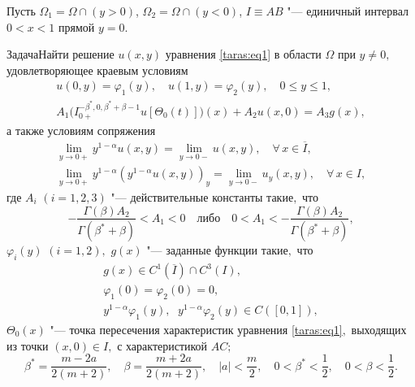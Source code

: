 Пусть $\Omega_{1}= \Omega \cap (y>0)$, $\Omega_{2}= \Omega \cap (y<0)$, $I \equiv AB$ "--- единичный интервал $0<x<1$ прямой $y=0$.

\smallskip

\begin{newthm}{Задача}Найти решение $u(x,y)$ уравнения \eqref{taras:eq1} в области $\Omega$ при $y \ne 0,$ удовлетворяющее краевым условиям
\begin{gather}
\label{taras:eq3}
u(0, y) = \varphi_{1}(y), \quad  u(1, y) = \varphi_{2}(y), \quad  0 \leqslant y \leqslant 1,
\\
\label{taras:eq4}
A_{1} \bigl( I^{ -\beta^{*}, 0, \beta^{*}+\beta-1}_{0+} u[ \Theta_{0}(t)] \bigr) (x)+A_{2} u(x, 0)= A_{3} g(x),
\end{gather}
а также условиям сопряжения
\begin{gather}
\label{taras:eq5}
\lim_{y \to 0+} y^{1-\alpha} u(x,y) = \lim_{y \to 0-} u(x,y), \quad  \forall \, x \in \overline{I},
\\
\label{taras:eq6}
\lim_{y \to 0+} y^{1-\alpha} \left( y^{1-\alpha}  u(x,y) \right)_{y} = \lim_{y \to 0-} u_{y}(x,y), \quad  \forall \, x \in  I,
\end{gather}
где $A_{i}$ $(i=1, 2, 3)$ "--- действительные константы такие$,$ что
\begin{equation}
\label{taras:eq7}
-\frac{\Gamma(\beta) A_{2}}{\Gamma(\beta^{*}+\beta)}< A_{1}<0 \quad \text{либо} \quad 0< A_{1}< -\frac{\Gamma(\beta) A_{2}}{\Gamma(\beta^{*}+\beta)},
\end{equation}
$\varphi_{i}(y)$ $(i=1, 2),$ $g(x)$ "--- заданные функ\-ции такие$,$ что 
\begin{gather}
\label{taras:eq8}
g(x) \in C^{1}(\overline{I}) \cap C^{3}( I),
\\
\label{taras:eq9}
\varphi_{1}(0)=  \varphi_{2}(0) =0,
\\
\label{taras:eq10}
y^{1- \alpha}\varphi_{1}(y), \, \ \  y^{1- \alpha}\varphi_{2}(y) \in C ( [0, 1]),
\end{gather}
$ \Theta_{0}(x)$ "--- точка пересечения характеристик уравнения \eqref{taras:eq1}$,$ выходящих
из точки $(x, 0)\in I,$ с характеристикой $AC;$
\[
\beta^{*}= \frac{m-2a}{2(m+2)}, \quad \beta =\frac{m+2a}{2(m+2)}, \quad
|a|< \frac{m}{2}, \quad 0< \beta^{*} < \frac{1}{2}, \quad 0< \beta < \frac{1}{2}.
\]
\end{newthm}

\smallskip

